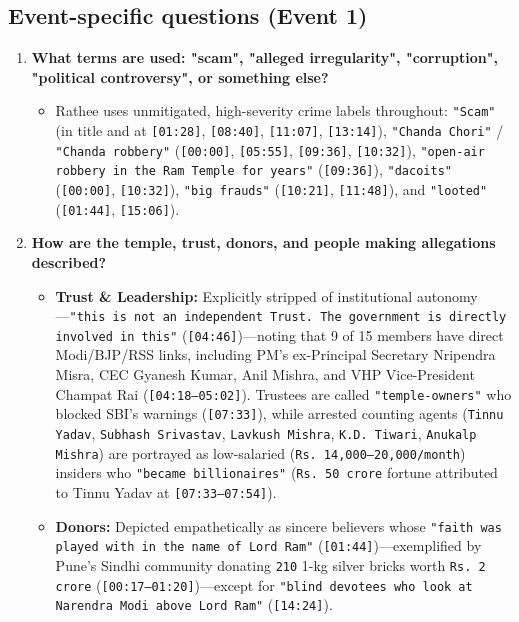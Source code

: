 \documentclass[10pt,a4paper]{article}
\begin{document}
\subsection*{Event-specific questions (Event 1)}
\begin{enumerate}[leftmargin=1.6em, itemsep=4pt, topsep=4pt]
  \item \textbf{What terms are used: "scam", "alleged irregularity", "corruption", "political controversy", or something else?}
  \begin{itemize}[leftmargin=1.4em, itemsep=2pt, topsep=2pt]
    \item Rathee uses unmitigated, high-severity crime labels throughout: \texttt{"Scam"} (in title and at \texttt{[01:28]}, \texttt{[08:40]}, \texttt{[11:07]}, \texttt{[13:14]}), \texttt{"Chanda Chori"} / \texttt{"Chanda robbery"} (\texttt{[00:00]}, \texttt{[05:55]}, \texttt{[09:36]}, \texttt{[10:32]}), \texttt{"open-air robbery in the Ram Temple for years"} (\texttt{[09:36]}), \texttt{"dacoits"} (\texttt{[00:00]}, \texttt{[10:32]}), \texttt{"big frauds"} (\texttt{[10:21]}, \texttt{[11:48]}), and \texttt{"looted"} (\texttt{[01:44]}, \texttt{[15:06]}).
  \end{itemize}
  \item \textbf{How are the temple, trust, donors, and people making allegations described?}
  \begin{itemize}[leftmargin=1.4em, itemsep=2pt, topsep=2pt]
    \item \textbf{Trust \& Leadership:} Explicitly stripped of institutional autonomy---\texttt{"this is not an independent Trust. The government is directly involved in this"} (\texttt{[04:46]})---noting that 9 of 15 members have direct Modi/BJP/RSS links, including PM's ex-Principal Secretary Nripendra Misra, CEC Gyanesh Kumar, Anil Mishra, and VHP Vice-President Champat Rai (\texttt{[04:18--05:02]}). Trustees are called \texttt{"temple-owners"} who blocked SBI's warnings (\texttt{[07:33]}), while arrested counting agents (\texttt{Tinnu Yadav}, \texttt{Subhash Srivastav}, \texttt{Lavkush Mishra}, \texttt{K.D. Tiwari}, \texttt{Anukalp Mishra}) are portrayed as low-salaried (\texttt{Rs.\,14,000--20,000/month}) insiders who \texttt{"became billionaires"} (\texttt{Rs.\,50 crore} fortune attributed to Tinnu Yadav at \texttt{[07:33--07:54]}).
    \item \textbf{Donors:} Depicted empathetically as sincere believers whose \texttt{"faith was played with in the name of Lord Ram"} (\texttt{[01:44]})---exemplified by Pune's Sindhi community donating \texttt{210} 1-kg silver bricks worth \texttt{Rs.\,2 crore} (\texttt{[00:17--01:20]})---except for \texttt{"blind devotees who look at Narendra Modi above Lord Ram"} (\texttt{[14:24]}).

\end{itemize}
\end{enumerate}
\end{document}
